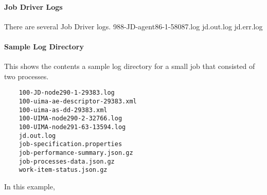 \paragraph{Job Driver Logs}
There are several Job Driver logs.
   988-JD-agent86-1-58087.log
   jd.out.log
   jd.err.log

\paragraph{Sample Log Directory}
This shows the contents a sample log directory for a small job that consisted of two processes.

\begin{verbatim}
    100-JD-node290-1-29383.log 
    100-uima-ae-descriptor-29383.xml 
    100-uima-as-dd-29383.xml 
    100-UIMA-node290-2-32766.log 
    100-UIMA-node291-63-13594.log 
    jd.out.log 
    job-specification.properties 
    job-performance-summary.json.gz
    job-processes-data.json.gz
    work-item-status.json.gz

\end{verbatim}

In this example, 

